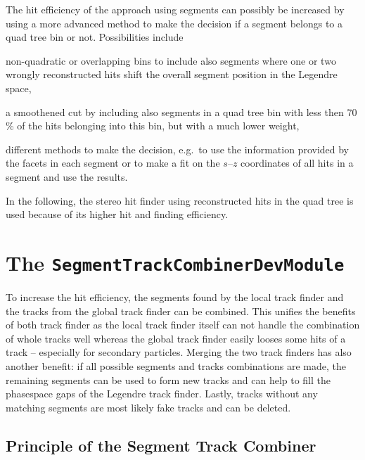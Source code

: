 The hit efficiency of the approach using segments can possibly be increased by using a more advanced method to make the decision if a segment belongs to a quad tree bin or not. Possibilities include 
\begin{zlist}
 \item non-quadratic or overlapping bins to include also segments where one or two wrongly reconstructed hits shift the overall segment position in the Legendre space,
 \item a smoothened cut by including also segments in a quad tree bin with less then 70 \% of the hits belonging into this bin, but with a much lower weight,
 \item different methods to make the decision, e.g.\ to use the information provided by the facets in each segment or to make a fit on the $s$--$z$ coordinates of all hits in a segment and use the results.
\end{zlist}

In the following, the stereo hit finder using reconstructed hits in the quad tree is used because of its higher hit and finding efficiency.

\section{The \texttt{SegmentTrackCombinerDevModule}} \label{section-combiner}

To increase the hit efficiency, the segments found by the local track finder and the tracks from the global track finder can be combined. This unifies the benefits of both track finder as the local track finder itself can not handle the combination of whole tracks well whereas the global track finder easily looses some hits of a track -- especially for secondary particles. Merging the two track finders has also another benefit: if all possible segments and tracks combinations are made, the remaining segments can be used to form new tracks and can help to fill the phasespace gaps of the Legendre track finder. Lastly, tracks without any matching segments are most likely fake tracks and can be deleted.

\subsection{Principle of the Segment Track Combiner}

